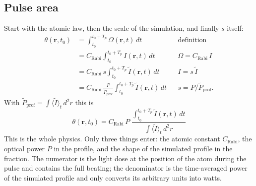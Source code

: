 
\subsection*{Pulse area}
Start with the atomic law, then the scale of the simulation, and finally $s$ itself:
\begin{align}
\theta(\mathbf r,t_0)
&=\int_{t_0}^{t_0+T_p}\Omega(\mathbf r,t)\,dt
&&\text{definition}\\
&=C_\text{Rabi}\int_{t_0}^{t_0+T_p}I(\mathbf r,t)\,dt
&&\Omega=C_\text{Rabi}\,I\\
&=C_\text{Rabi}\,s\int_{t_0}^{t_0+T_p}\tilde I(\mathbf r,t)\,dt
&&I=s\,\tilde I\\
&=C_\text{Rabi}\,\frac{P}{\tilde P_\text{prof}}\int_{t_0}^{t_0+T_p}\tilde I(\mathbf r,t)\,dt
&&s=P/\tilde P_\text{prof}.
\end{align}
With $\tilde P_\text{prof}=\int\langle\tilde I\rangle_t\,d^2r$ this is
\begin{equation}
\boxed{\;\theta(\mathbf r,t_0)=C_\text{Rabi}\,P\;
\frac{\displaystyle\int_{t_0}^{t_0+T_p}\tilde I(\mathbf r,t)\,dt}
{\displaystyle\int\langle\tilde I\rangle_t\,d^2r}\;}
\label{eq:theta_box}
\end{equation}
This is the whole physics. Only three things enter: the atomic constant $C_\text{Rabi}$, the optical
power $P$ in the profile, and the shape of the simulated profile in the fraction. The numerator is the
light dose at the position of the atom during the pulse and contains the full beating; the
denominator is the time-averaged power of the simulated profile and only converts its arbitrary
units into watts.


